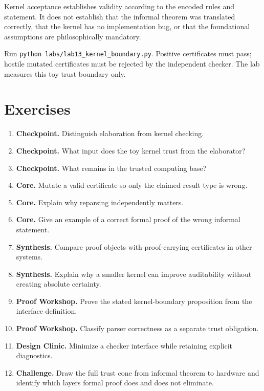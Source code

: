 

\begin{warningbox}
Kernel acceptance establishes validity according to the encoded rules and statement. It does not establish that the informal theorem was translated correctly, that the kernel has no implementation bug, or that the foundational assumptions are philosophically mandatory.
\end{warningbox}

\begin{labbox}
Run \texttt{python labs/lab13_kernel_boundary.py}. Positive certificates must pass; hostile mutated certificates must be rejected by the independent checker. The lab measures this toy trust boundary only.
\end{labbox}

\section*{Exercises}
\begin{enumerate}[label=\textbf{13.\arabic*.}]
\item \textbf{Checkpoint.} Distinguish elaboration from kernel checking.
\item \textbf{Checkpoint.} What input does the toy kernel trust from the elaborator?
\item \textbf{Checkpoint.} What remains in the trusted computing base?
\item \textbf{Core.} Mutate a valid certificate so only the claimed result type is wrong.
\item \textbf{Core.} Explain why reparsing independently matters.
\item \textbf{Core.} Give an example of a correct formal proof of the wrong informal statement.
\item \textbf{Synthesis.} Compare proof objects with proof-carrying certificates in other systems.
\item \textbf{Synthesis.} Explain why a smaller kernel can improve auditability without creating absolute certainty.
\item \textbf{Proof Workshop.} Prove the stated kernel-boundary proposition from the interface definition.
\item \textbf{Proof Workshop.} Classify parser correctness as a separate trust obligation.
\item \textbf{Design Clinic.} Minimize a checker interface while retaining explicit diagnostics.
\item \textbf{Challenge.} Draw the full trust cone from informal theorem to hardware and identify which layers formal proof does and does not eliminate.
\end{enumerate}
